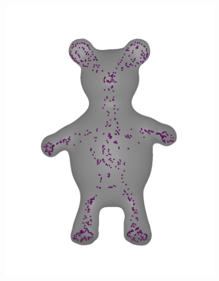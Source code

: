 \documentclass[review]{acmsiggraph}
\begin{document}
\begin{figure}
\begin{subfigure}[b]{0.19\linewidth}
                \includegraphics[width=\textwidth]{images/bear/2.pdf}
        \end{subfigure}
~
		\begin{subfigure}[b]{0.19\linewidth}
                \centering

\end{subfigure}
\end{figure}
\end{document}
